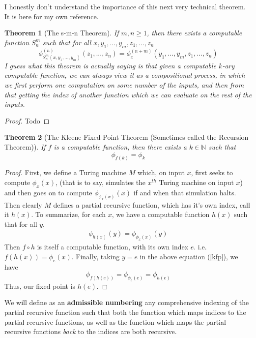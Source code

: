 \documentclass{article}
\theoremstyle{definition}
\theoremstyle{plain}
\theoremstyle{theorem}
\newtheorem{theorem}{Theorem}[section]
\begin{document}
I honestly don't understand the importance of this next very technical theorem. It is here for my own reference.
\begin{theorem}[The s-m-n Theorem]
    If $m,n \geq 1$, then there exists a computable function $S_n^m$ such that for all $x,y_1,...,y_m,z_1,...,z_n$
    \[ \phi_{S_n^m(x,y_1,...,y_m)}^{(n)}(z_1,...,z_n) = \phi_x^{(n+m)}(y_1,...,y_m,z_1,...,z_n) \]
    I guess what this theorem is actually saying is that given a computable $k$-ary computable function, we can always view it as a compositional process, in which we first perform one computation on some number of the inputs, and then from that getting the index of another function which we can evaluate on the rest of the inputs.
\end{theorem}
\begin{proof}
 Todo
\end{proof}
\begin{theorem}[The Kleene Fixed Point Theorem (Sometimes called the Recursion Theorem)]
    If $f$ is a computable function, then there exists a $k \in \mathbb{N}$ such that 
    \[ \phi_{f(k)} = \phi_k \]
\end{theorem}
\begin{proof}
    First, we define a Turing machine $M$ which, on input $x$, first seeks to compute $\phi_x(x)$, (that is to say, simulates the $x^{th}$ Turing machine on input $x$) and then goes on to compute $\phi_{\phi_x(x)}(x)$ if and when that simulation halts. Then clearly $M$ defines a partial recursive function, which has it's own index, call it $h(x)$. To summarize, for each $x$, we have a computable function $h(x)$ such that for all $y$,
    \begin{align}
        \phi_{h(x)}(y) = \phi_{\phi_x(x)}(y) \label{kfp}
    \end{align}
    Then $f \circ h$ is itself a computable function, with its own index $e$. i.e. $f(h(x)) = \phi_e(x)$. Finally, taking $y = e$ in the above equation (\ref{kfp}), we have 
    \[ \phi_{f(h(e))} = \phi_{\phi_e(e)} = \phi_{h(e)} \]
    Thus, our fixed point is $h(e)$.
\end{proof}
\par We will define as an \textbf{admissible numbering} any comprehensive indexing of the partial recursive function such that both the function which maps indices to the partial recursive functions, as well as the function which maps the partial recursive functions \textit{back} to the indices are both recursive. 
\end{document}
